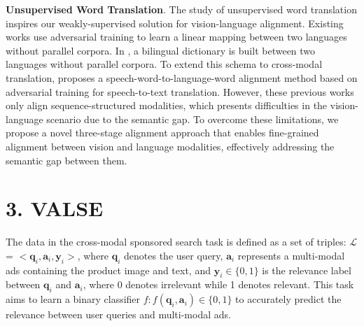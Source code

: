 \documentclass[letterpaper]{article} \usepackage{aaai24}  \usepackage{times}  \usepackage{helvet}  \usepackage{courier}  \usepackage[hyphens]{url}  \usepackage{graphicx} \urlstyle{rm} \def\UrlFont{\rm}  \usepackage{natbib}  \usepackage{caption} \frenchspacing  \setlength{\pdfpagewidth}{8.5in}  \setlength{\pdfpageheight}{11in}
\begin{document}
\noindent\textbf{Unsupervised Word Translation}. The study of unsupervised word translation inspires our weakly-supervised solution for vision-language alignment. Existing works \cite{lample2018word,artetxe2019effective,pourdamghani2019translating} use adversarial training to learn a linear mapping between two languages without parallel corpora. In \cite{lample2018word}, a bilingual dictionary is built between two languages without parallel corpora. To extend this schema to cross-modal translation, \cite{chung2018unsupervised} proposes a speech-word-to-language-word alignment method based on adversarial training for speech-to-text translation. However, these previous works only align sequence-structured modalities, which presents difficulties in the vision-language scenario due to the semantic gap. To overcome these limitations, we propose a novel three-stage alignment approach that enables fine-grained alignment between vision and language modalities, effectively addressing the semantic gap between them.

\section{3. VALSE}
\label{sec:VALSE}
The data in the cross-modal sponsored search task is defined as a set of triples: $\mathcal{L}$ = $< \boldsymbol{q}_i, \boldsymbol{a}_i, \boldsymbol{y}_i >$, where $\boldsymbol{q}_i$ denotes the user query, $\boldsymbol{a}_i$ represents a multi-modal ads containing the product image and text, and $\boldsymbol{y}_i\in{\{0, 1\}}$ is the relevance label between $\boldsymbol{q}_i$ and $\boldsymbol{a}_i$, where 0 denotes irrelevant while 1 denotes relevant. This task aims to learn a binary classifier $f : f(\boldsymbol{q}_i, \boldsymbol{a}_i)\in{\{0, 1\}}$ to accurately predict the relevance between user queries and multi-modal ads. 
\end{document}
